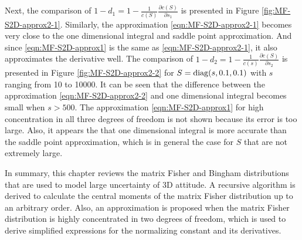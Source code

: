 Next, the comparison of $1-d_1 = 1-\tfrac{1}{c(S)} \tfrac{\partial c(S)}{\partial s_1}$ is presented in Figure \ref{fig:MF-S2D-approx2-1}.
Similarly, the approximation \eqref{eqn:MF-S2D-approx2-1} becomes very close to the one dimensional integral and saddle point approximation.
And since \eqref{eqn:MF-S2D-approx1} is the same as \eqref{eqn:MF-S2D-approx2-1}, it also approximates the derivative well.
The comparison of $1-d_2 = 1-\tfrac{1}{c(s)}\tfrac{\partial c(S)}{\partial s_2}$ is presented in Figure \ref{fig:MF-S2D-approx2-2} for $S = \mathrm{diag}(s,0.1,0.1)$ with $s$ ranging from 10 to 10000.
It can be seen that the difference between the approximation \eqref{eqn:MF-S2D-approx2-2} and one dimensional integral becomes small when $s>500$.
The approximation \eqref{eqn:MF-S2D-approx1} for high concentration in all three degrees of freedom is not shown because its error is too large.
Also, it appears the that one dimensional integral is more accurate than the saddle point approximation, which is in general the case for $S$ that are not extremely large.

In summary, this chapter reviews the matrix Fisher and Bingham distributions that are used to model large uncertainty of 3D attitude.
A recursive algorithm is derived to calculate the central moments of the matrix Fisher distribution up to an arbitrary order.
Also, an approximation is proposed when the matrix Fisher distribution is highly concentrated in two degrees of freedom, which is used to derive simplified expressions for the normalizing constant and its derivatives.
